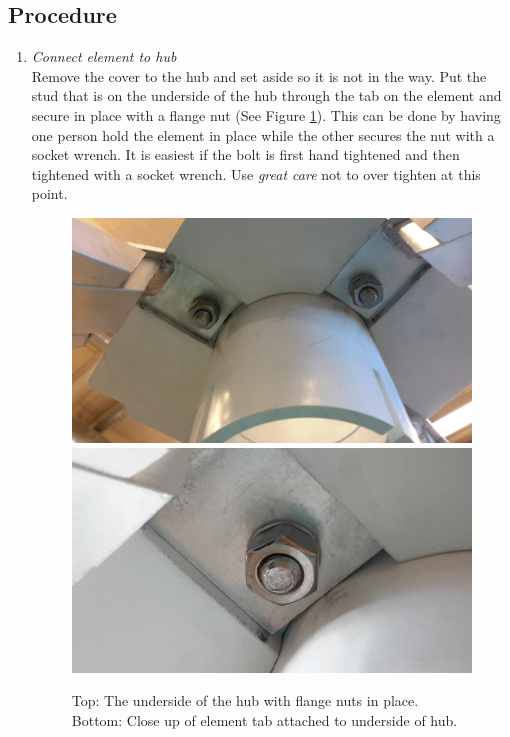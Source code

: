 \documentclass[12pt]{article}
\begin{document}
\begin{enumerate}
	\subsection{Procedure}
		\begin{enumerate}
			\item \emph{Connect element to hub} \\ Remove the cover to the hub and set aside so it is not in the way. Put the stud that is on the underside of the hub through the tab on the element and secure in place with a flange nut (See Figure \ref{UnderHub}). This can be done by having one person hold the element in place while the other secures the nut with a socket wrench. It is easiest if the bolt is first hand tightened and then tightened with a socket wrench. Use \emph{great care} not to over tighten at this point.
			
\begin{figure}[!h]
	\center
	\includegraphics[width=\linewidth]{plots/20141125_110653.jpg}
	\includegraphics[width=\linewidth]{plots/20141212_153321.jpg}
	\caption{Top: The underside of the hub with flange nuts in place. Bottom: Close up of element tab attached to underside of hub. \label{UnderHub}}
\end{figure}	


\end{enumerate}
\end{enumerate}
\end{document}
